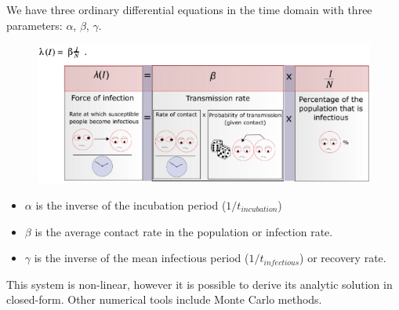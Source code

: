 \documentclass{article}\usepackage[]{graphicx}\usepackage[]{color}
\begin{document}
We have three ordinary differential equations in the time domain with three parameters: $\alpha$, $\beta$, $\gamma$.


\begin{figure}
\includegraphics[width=1.0\textwidth]{"png/SIR3"}
\end{figure}


\begin{itemize}

\item $\alpha$ is the inverse of the incubation period ($1/t_{incubation}$)

\item $\beta$ is the average contact rate in the population or infection rate.

\item $\gamma$ is the inverse of the mean infectious period ($1/t_{infectious}$) or recovery rate.

\end{itemize}

This system is non-linear, however it is possible to derive its analytic solution in closed-form. Other numerical tools include Monte Carlo methods.
\end{document}

